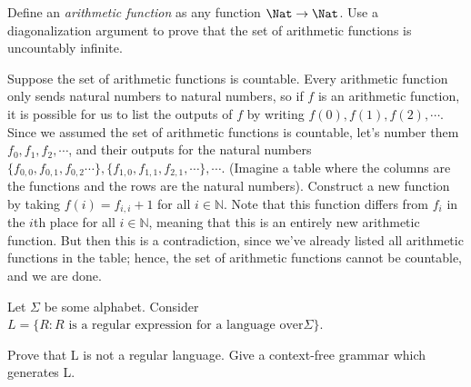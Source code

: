 \documentclass[solution, letterpaper]{cs121}
\begin{document}
Define an \emph{arithmetic function} as any function $\Nat \to \Nat$. Use a diagonalization argument to prove that the set of arithmetic functions is uncountably infinite.

\begin{solution}
Suppose the set of arithmetic functions is countable.  Every arithmetic function only sends natural numbers to natural numbers, so if $f$ is an arithmetic function, it is possible for us to list the outputs of $f$ by writing $f(0), f(1), f(2), \cdots$.
Since we assumed the set of arithmetic functions is countable, let's number them $f_0, f_1, f_2, \cdots$, and their outputs for the natural numbers $\{f_{0,0},f_{0,1},f_{0,2}\cdots\}, \{f_{1,0},f_{1,1},f_{2,1},\cdots\}, \cdots$.  (Imagine a table where the columns are the functions and the rows are the natural numbers).  Construct a new function by taking $f(i) = f_{i,i}+1$ for all $i \in \mathbb{N}$.  Note that this function differs from $f_i$ in the $i$th place for all $i \in \mathbb{N}$, meaning that this is an entirely new arithmetic function.  But then this is a contradiction, since we've already listed all arithmetic functions in the table; hence, the set of arithmetic functions cannot be countable, and we are done.
\end{solution}



Let $\Sigma$ be some alphabet. Consider $L = \{ R : R \text{ is a regular expression for a language over} \Sigma \}$. 

\subproblem Prove that L is not a regular language. 
\subproblem Give a context-free grammar which generates L. 
 
\end{document}
